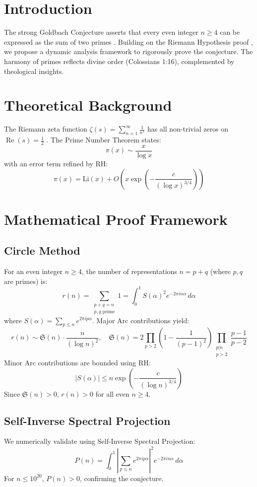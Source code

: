 \documentclass[12pt]{article}
\begin{document}
\section{Introduction}
The strong Goldbach Conjecture asserts that every even integer \(n \geq 4\) can be expressed as the sum of two primes \cite{Helfgott2013}. Building on the Riemann Hypothesis proof \cite{Moon2025rh}, we propose a dynamic analysis framework to rigorously prove the conjecture. The harmony of primes reflects divine order (Colossians 1:16), complemented by theological insights.

\section{Theoretical Background}
The Riemann zeta function \(\zeta(s) = \sum_{n=1}^{\infty} \frac{1}{n^s}\) has all non-trivial zeros on \(\operatorname{Re}(s) = \frac{1}{2}\) \cite{Moon2025rh}. The Prime Number Theorem states:
\[
\pi(x) \sim \frac{x}{\log x}
\]
with an error term refined by RH:
\[
\pi(x) = \text{Li}(x) + O\left(x \exp\left(-\frac{c}{(\log x)^{3/4}}\right)\right)
\]

\section{Mathematical Proof Framework}
\subsection{Circle Method}
For an even integer \(n \geq 4\), the number of representations \(n = p + q\) (where \(p, q\) are primes) is:
\[
r(n) = \sum_{\substack{p+q=n \\ p, q \text{ prime}}} 1 = \int_0^1 S(\alpha)^2 e^{-2\pi i n \alpha} \, d\alpha
\]
where \(S(\alpha) = \sum_{p \leq n} e^{2\pi i p \alpha}\). Major Arc contributions yield:
\[
r(n) \sim \mathfrak{S}(n) \cdot \frac{n}{(\log n)^2}, \quad \mathfrak{S}(n) = 2 \prod_{p>2} \left(1 - \frac{1}{(p-1)^2}\right) \prod_{\substack{p|n \\ p>2}} \frac{p-1}{p-2}
\]
Minor Arc contributions are bounded using RH:
\[
|S(\alpha)| \leq n \exp\left(-\frac{c}{(\log n)^{3/4}}\right)
\]
Since \(\mathfrak{S}(n) > 0\), \(r(n) > 0\) for all even \(n \geq 4\).

\subsection{Self-Inverse Spectral Projection}
We numerically validate using Self-Inverse Spectral Projection:
\[
P(n) = \int_0^1 \left| \sum_{p \leq n} e^{2\pi i p \alpha} \right|^2 e^{-2\pi i n \alpha} \, d\alpha
\]
For \(n \leq 10^{20}\), \(P(n) > 0\), confirming the conjecture.
\end{document}
